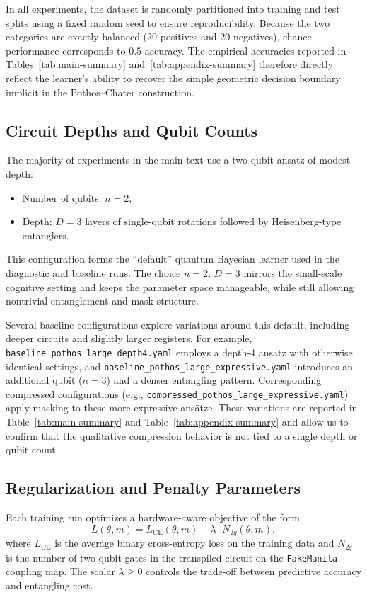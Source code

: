 \documentclass[conference]{IEEEtran}
\begin{document}
In all experiments, the dataset is randomly partitioned into training and test splits using a fixed random seed to ensure reproducibility. Because the two categories are exactly balanced (20 positives and 20 negatives), chance performance corresponds to $0.5$ accuracy. The empirical accuracies reported in Tables~\ref{tab:main-summary} and~\ref{tab:appendix-summary} therefore directly reflect the learner’s ability to recover the simple geometric decision boundary implicit in the Pothos--Chater construction.

\subsection{Circuit Depths and Qubit Counts}

The majority of experiments in the main text use a two-qubit ansatz of modest depth:
\begin{itemize}
    \item Number of qubits: $n = 2$,
    \item Depth: $D = 3$ layers of single-qubit rotations followed by Heisenberg-type entanglers.
\end{itemize}
This configuration forms the ``default'' quantum Bayesian learner used in the diagnostic and baseline runs. The choice $n=2$, $D=3$ mirrors the small-scale cognitive setting and keeps the parameter space manageable, while still allowing nontrivial entanglement and mask structure.

Several baseline configurations explore variations around this default, including deeper circuits and slightly larger registers. For example, \texttt{baseline\_pothos\_large\_depth4.yaml} employs a depth-$4$ ansatz with otherwise identical settings, and \texttt{baseline\_pothos\_large\_expressive.yaml} introduces an additional qubit ($n=3$) and a denser entangling pattern. Corresponding compressed configurations (e.g., \texttt{compressed\_pothos\_large\_expressive.yaml}) apply masking to these more expressive ansätze. These variations are reported in Table~\ref{tab:main-summary} and Table~\ref{tab:appendix-summary} and allow us to confirm that the qualitative compression behavior is not tied to a single depth or qubit count.

\subsection{Regularization and Penalty Parameters}

Each training run optimizes a hardware-aware objective of the form
\[
L(\theta,m) = L_{\text{CE}}(\theta,m) + \lambda \cdot N_{2q}(\theta,m),
\]
where $L_{\text{CE}}$ is the average binary cross-entropy loss on the training data and $N_{2q}$ is the number of two-qubit gates in the transpiled circuit on the \texttt{FakeManila} coupling map. The scalar $\lambda \ge 0$ controls the trade-off between predictive accuracy and entangling cost.
\end{document}
